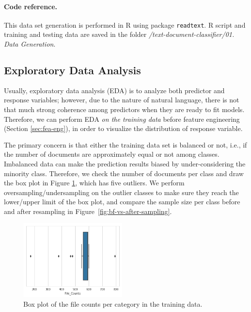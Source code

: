 \documentclass[11pt]{article}
\theoremstyle{remark}
\begin{document}
\paragraph{Code reference.}
This data set generation is performed in R using package \texttt{readtext}. 
R script and training and testing data are saved in the folder {\em /text-document-classifier/01. Data Generation}.

\subsection{Exploratory Data Analysis}

Usually, exploratory data analysis (EDA) is to analyze both predictor and response variables; 
however, due to the nature of natural language, there is not that much strong coherence among predictors when they are ready to fit models. 
Therefore, we can perform EDA {\em on the training data} before feature engineering (Section \ref{sec:fea-eng}), in order to visualize the distribution of response variable.

The primary concern is that either the training data set is balanced or not, i.e., if the number of documents are approximately equal or not among classes. 
Imbalanced data can make the prediction results biased by under-considering the minority class. 
Therefore, we check the number of documents per class and draw the box plot in Figure \ref{fig:box-plot-counts}, which has five outliers.
We perform oversampling/undersampling on the outlier classes to make sure they reach the lower/upper limit of the box plot, and compare the sample size per class before and after resampling in Figure~\ref{fig:bf-vs-after-sampling}.

\begin{figure}
  \begin{center}
    \includegraphics[width=0.48\textwidth]{figs/figure1_box_plot.png}
  \end{center}
  \caption{Box plot of the file counts per category in the training data.}
  \label{fig:box-plot-counts}
\end{figure}
\end{document}
